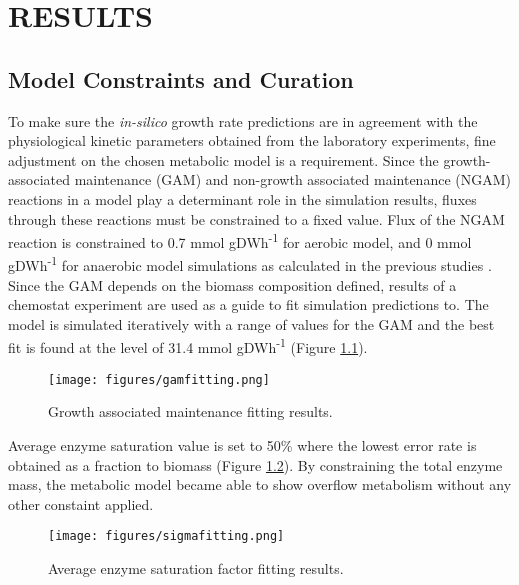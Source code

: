\chapter{RESULTS}

\section{Model Constraints and Curation}


To make sure the \emph{in-silico} growth rate predictions are in agreement with the physiological kinetic parameters obtained from the laboratory experiments, fine adjustment on the chosen metabolic model is a requirement. Since the growth-associated maintenance (GAM) and non-growth associated maintenance (NGAM) reactions in a model play a determinant role in the simulation results, fluxes through these reactions must be constrained to a fixed value. Flux of the NGAM reaction is constrained to 0.7 mmol gDWh\textsuperscript{-1} for aerobic model, and 0 mmol gDWh\textsuperscript{-1} for anaerobic model simulations as calculated in the previous studies \cite{nilsson2016metabolic}. Since the GAM depends on the biomass composition defined, results of a chemostat experiment \cite{van1998effect} are used as a guide to fit simulation predictions to. The model is simulated iteratively with a range of values for the GAM and the best fit is found at the level of 31.4 mmol gDWh\textsuperscript{-1} (Figure \ref{fig:gam_fitting}).

\begin{figure}[H]
  \begin{center}
  \texttt{[image: figures/gamfitting.png]}
  \caption[Growth associated maintenance fitting]{Growth associated maintenance fitting results.}
  \end{center}
  \label{fig:gam_fitting}
\end{figure}

Average enzyme saturation value is set to 50\% where the lowest error rate is obtained as a fraction to biomass (Figure \ref{fig:sigma_fitting}). By constraining the total enzyme mass, the metabolic model became able to show overflow metabolism without any other constaint applied.

\begin{figure}[H]
  \begin{center}
  \texttt{[image: figures/sigmafitting.png]}
  \caption[Average enzyme saturation factor fitting]{Average enzyme saturation factor fitting results.}
  \end{center}
  \label{fig:sigma_fitting}
\end{figure}

